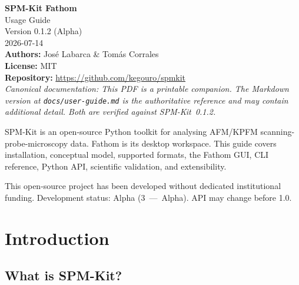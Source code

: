 \documentclass[a4paper,11pt]{article}
\begin{document}

\begin{titlepage}
\raggedright
\vspace*{4cm}

{\Huge\bfseries SPM-Kit {\textperiodcentered} Fathom}\\[0.4cm]
{\LARGE Usage Guide}\\[1.5cm]
{\large Version 0.1.2 (Alpha)}\\[0.3cm]
{\large 2026-07-14}\\[2cm]

{\normalsize
  \textbf{Authors:} Jos\'e Labarca \& Tom\'as Corrales\\
  \textbf{License:} MIT\\
  \textbf{Repository:} \url{https://github.com/kegouro/spmkit}\\[1cm]

  \emph{Canonical documentation: This PDF is a printable companion. The Markdown
  version at \texttt{docs/user-guide.md} is the authoritative reference and may
  contain additional detail. Both are verified against SPM-Kit~0.1.2.}
}

\vspace{1cm}
{\normalsize
  SPM-Kit is an open-source Python toolkit for analysing AFM/KPFM scanning-probe-microscopy
  data. Fathom is its desktop workspace. This guide covers installation, conceptual model,
  supported formats, the Fathom GUI, CLI reference, Python API, scientific validation,
  and extensibility.
}

\vfill
{\footnotesize
  This open-source project has been developed without dedicated institutional funding.
  Development status: Alpha (3~---~Alpha). API may change before 1.0.
}
\end{titlepage}

\tableofcontents
\clearpage

\section{Introduction}

\subsection{What is SPM-Kit?}
\end{document}
